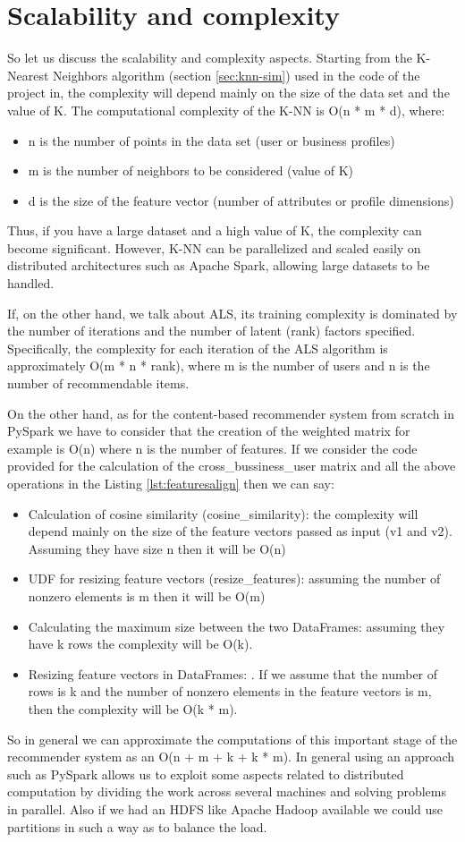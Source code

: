 \documentclass[12pt,english]{report}
\begin{document}
\chapter{Scalability and complexity}\label{ch:scalability}
So let us discuss the scalability and complexity aspects. Starting from the K-Nearest Neighbors algorithm (section \ref{sec:knn-sim}) used in the code of the project in, the complexity will depend mainly on the size of the data set and the value of K. The computational complexity of the K-NN is O(n * m * d), where:
\begin{itemize}
\item n is the number of points in the data set (user or business profiles)
\item m is the number of neighbors to be considered (value of K)
\item d is the size of the feature vector (number of attributes or profile dimensions)
\end{itemize}
Thus, if you have a large dataset and a high value of K, the complexity can become significant. However, K-NN can be parallelized and scaled easily on distributed architectures such as Apache Spark, allowing large datasets to be handled.\par 
If, on the other hand, we talk about ALS, its training complexity is dominated by the number of iterations and the number of latent (rank) factors specified. Specifically, the complexity for each iteration of the ALS algorithm is approximately O(m * n * rank), where m is the number of users and n is the number of recommendable items. \par 
On the other hand, as for the content-based recommender system from scratch in PySpark we have to consider that the creation of the weighted matrix for example is O(n) where n is the number of features. If we consider the code provided for the calculation of the cross\_bussiness\_user matrix and all the above operations in the Listing \ref{lst:featuresalign} then we can say:
\begin{itemize}
\item Calculation of cosine similarity (cosine\_similarity): the complexity will depend mainly on the size of the feature vectors passed as input (v1 and v2). Assuming they have size n then it will be O(n)
\item UDF for resizing feature vectors (resize\_features): assuming the number of nonzero elements is m then it will be O(m)
\item Calculating the maximum size between the two DataFrames: assuming they have k rows the complexity will be O(k).
\item Resizing feature vectors in DataFrames: . If we assume that the number of rows is k and the number of nonzero elements in the feature vectors is m, then the complexity will be O(k * m).
\end{itemize}
So in general we can approximate the computations of this important stage of the recommender system as an O(n + m + k + k * m).
In general using an approach such as PySpark allows us to exploit some aspects related to distributed computation by dividing the work across several machines and solving problems in parallel. Also if we had an HDFS like Apache Hadoop available we could use partitions in such a way as to balance the load.
\end{document}
